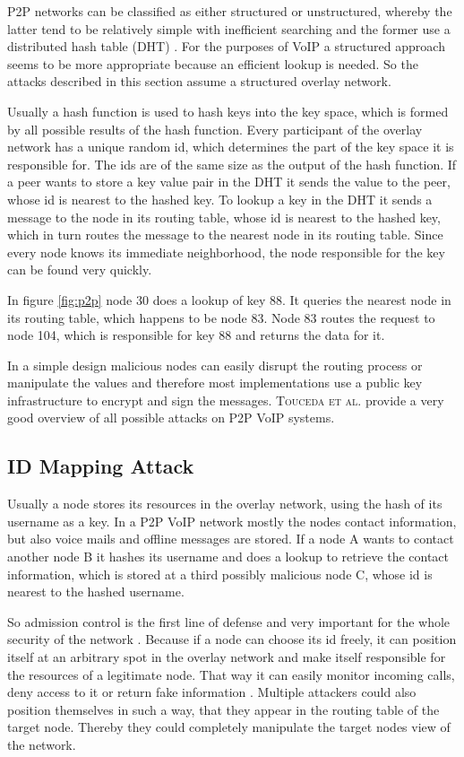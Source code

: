 \documentclass[a4paper,conference]{IEEEtran}
\begin{document}
P2P networks can be classified as either structured or unstructured, whereby the
latter tend to be relatively simple with inefficient searching and the former
use
a distributed hash table (DHT) \cite{chopra}. For the purposes of VoIP a
structured approach seems to be more appropriate because an
efficient lookup is needed. So the attacks described in this section assume a
structured overlay network.


Usually a hash function is used to hash keys into the key space, which is formed
by all possible results of the hash function. Every participant of the overlay
network has a unique random id, which determines the part of the key space it is
responsible for. The ids are of the same size
as the output of the hash function. If a peer wants to store a key value pair in
the DHT it sends the value to the peer, whose id is nearest to the hashed key.
To lookup a key in the DHT it sends a message to the
node in its routing table, whose id is nearest to the hashed key, which in turn
routes the message to the nearest node in its routing table.
Since every node knows its immediate neighborhood, the node responsible for the
key can be found very quickly.

In figure \ref{fig:p2p} node 30 does a lookup of key 88. It queries the nearest
node in its routing table, which happens to be node 83. Node 83 routes the
request to node 104, which is responsible for key 88 and returns the data for
it.

In a simple design malicious nodes can easily disrupt the routing process or
manipulate the values and therefore most implementations use a
public key infrastructure to encrypt and sign the messages. \textsc{Touceda et
al.} \cite{touceda} provide a very good overview of all possible attacks on P2P
VoIP systems.

\subsection{ID Mapping Attack}
\label{idmap}
Usually a node stores its resources in the overlay network, using the hash of
its username as a key. In a P2P VoIP network mostly the nodes contact
information, but
 also voice mails and offline messages are stored. If a node A wants to contact
another node B it hashes its username and does a lookup to retrieve the
contact information, which is stored at a third possibly malicious node C, whose
id is nearest to the hashed username.

So admission control is the first line of defense and very important for the
whole security of the network \cite{touceda, chopra}.
Because if a node can choose its id freely, it can position itself at an
arbitrary spot in the overlay network and make itself responsible for the
resources of a legitimate node. That way it can easily monitor incoming calls,
deny access to it or return fake information \cite{touceda}. Multiple attackers
could also position themselves in such a way, that they appear in the routing
table of the target node. Thereby they could completely manipulate the target
nodes view
of the network.
\end{document}
